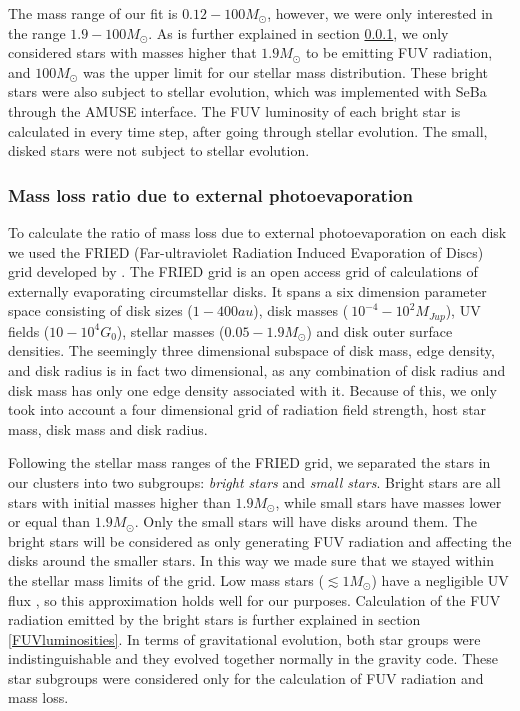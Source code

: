 \documentclass[fleqn,usenatbib]{mnras}
\begin{document}


The mass range of our fit is $0.12 - 100 M_{\odot}$, however, we were only interested in the range $1.9 - 100 M_{\odot}$. As is further explained in section \ref{grid}, we only considered stars with masses higher that $1.9 M_{\odot}$ to be emitting FUV radiation, and $100 M_{\odot}$ was the upper limit for our stellar mass distribution. These bright stars were also subject to stellar evolution, which was implemented with SeBa through the AMUSE interface. The FUV luminosity of each bright star is calculated in every time step, after going through stellar evolution. The small, disked stars were not subject to stellar evolution.

\subsubsection{Mass loss ratio due to external photoevaporation}\label{grid}
To calculate the ratio of mass loss due to external photoevaporation on each disk we used the FRIED (Far-ultraviolet Radiation Induced Evaporation of Discs) grid developed by \citet{haworth2018}. The FRIED grid is an open access grid of calculations of externally evaporating circumstellar disks. It spans a six dimension parameter space consisting of disk sizes ($1 - 400 au$), disk masses ($~10^{-4} - 10^{2} M_{Jup}$), UV fields ($10 - 10^{4} G_0$), stellar masses ($0.05 - 1.9 M_{\odot}$) and disk outer surface densities. The seemingly three dimensional subspace of disk mass, edge density, and disk radius is in fact two dimensional, as any combination of disk radius and disk mass has only one edge density associated with it. Because of this, we only took into account a four dimensional grid of radiation field strength, host star mass, disk mass and disk radius.

Following the stellar mass ranges of the FRIED grid, we separated the stars in our clusters into two subgroups: \textit{bright stars} and \textit{small stars}. Bright stars are all stars with initial masses higher than $1.9 M_{\odot}$, while small stars have masses lower or equal than $1.9 M_{\odot}$. Only the small stars will have disks around them. The bright stars will be considered as only generating FUV radiation and affecting the disks around the smaller stars. In this way we made sure that we stayed within the stellar mass limits of the grid. Low mass stars ($\lesssim 1 M_\odot$) have a negligible UV flux \citep{adams2006}, so this approximation holds well for our purposes. Calculation of the FUV radiation emitted by the bright stars is further explained in section \ref{FUVluminosities}. In terms of gravitational evolution, both star groups were indistinguishable and they evolved together normally in the gravity code. These star subgroups were considered only for the calculation of FUV radiation and mass loss.
\end{document}
